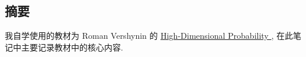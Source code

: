 \documentclass[12pt,a4paper]{article}
\begin{document}
\begin{center}
\section*{摘要}
\end{center}

我自学使用的教材为 Roman Vershynin 的 \href{https://www.math.uci.edu/~rvershyn/papers/HDP-book/HDP-2.pdf}{High-Dimensional Probability }
, 在此笔记中主要记录教材中的核心内容.


{\centering\tableofcontents}

\newpage
\end{document}
